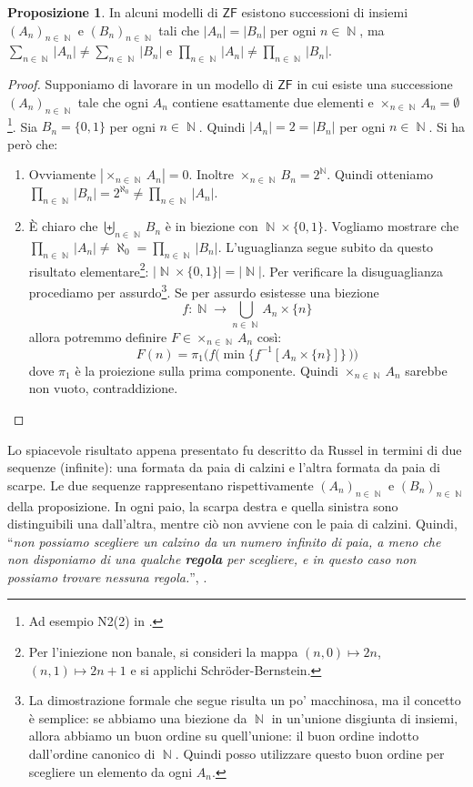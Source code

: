 \documentclass[12pt,a4paper]{report}
\theoremstyle{definition}
\newtheorem{prop}[teo]{Proposizione}  %
\theoremstyle{num.custom-title}
\DeclareMathOperator{\N}{\mathbb{N}}
\newcommand{\ZF}{\ensuremath{\mathsf{ZF}}\xspace}
\begin{document}
\begin{prop}
In alcuni modelli di \ZF esistono successioni di insiemi $(A_n)_{n \in \N}$ e $(B_n)_{n \in \N}$ tali che $|A_n|=|B_n|$ per ogni $n \in \N$, ma $\displaystyle\sum_{n \in \N} |A_n| \neq \displaystyle\sum_{n \in \N} |B_n|$ e $\displaystyle\prod_{n \in \N} |A_n| \neq \displaystyle\prod_{n \in \N} |B_n|$.
\begin{proof}
Supponiamo di lavorare in un modello di \ZF in cui esiste una successione $(A_n)_{n \in \N}$ tale che ogni $A_n$ contiene esattamente due elementi e $\times_{n \in \N} A_n = \emptyset$\footnote{Ad esempio N2(2) in \cite{HoRu98:Herrlich}.}. Sia $B_n=\{0,1\}$ per ogni $n \in \N$. Quindi $|A_n|=2=|B_n|$ per ogni $n \in \N$. Si ha però che:
\begin{enumerate}
\item Ovviamente $|\!\times_{n \in \N} A_n| = 0$. Inoltre $\times_{n \in \N} B_n = 2^{\N}$. Quindi otteniamo\\ $\displaystyle\prod_{n \in \N} |B_n| = 2^{\aleph_0} \neq \displaystyle\prod_{n \in \N} |A_n|$.
\item È chiaro che $\displaystyle\biguplus_{n \in \N} B_n$ è in biezione con $\N \times \{0,1\}$. Vogliamo mostrare che $\displaystyle\prod_{n \in \N} |A_n| \neq \aleph_0 = \displaystyle\prod_{n \in \N} |B_n|$. L'uguaglianza segue subito da questo risultato elementare\footnote{Per l'iniezione non banale, si consideri la mappa $(n,0) \mapsto 2n$, $(n,1) \mapsto 2n+1$ e si applichi Schröder-Bernstein.}: $|\N \times \{0,1\}|=|\N|$. Per verificare la disuguaglianza procediamo per assurdo\footnote{La dimostrazione formale che segue risulta un po' macchinosa, ma il concetto è semplice: se abbiamo una biezione da $\N$ in un'unione disgiunta di insiemi, allora abbiamo un buon ordine su quell'unione: il buon ordine indotto dall'ordine canonico di $\N$. Quindi posso utilizzare questo buon ordine per scegliere un elemento da ogni $A_n$.}. Se per assurdo esistesse una biezione 
\[
f: \N \to \displaystyle\bigcup_{n \in \N} A_n \times \{n\}
\]
allora potremmo definire $F \in \times_{n \in \N} A_n$ così:
\[
F(n)= \pi_1\Big(f\big(\min \big\{f^{-1}[A_n \times \{n\}] \big\} \, \big)\Big)
\]
dove $\pi_1$ è la proiezione sulla prima componente. Quindi $\times_{n \in \N} A_n$ sarebbe non vuoto, contraddizione.
\end{enumerate}
\end{proof}
\end{prop}

Lo spiacevole risultato appena presentato fu descritto da Russel in termini di due sequenze (infinite): una formata da paia di calzini e l'altra formata da paia di scarpe. Le due sequenze rappresentano rispettivamente $(A_n)_{n \in \N}$ e $(B_n)_{n \in \N}$ della proposizione. In ogni paio, la scarpa destra e quella sinistra sono distinguibili una dall'altra, mentre ciò non avviene con le paia di calzini. Quindi, ``\emph{non possiamo scegliere un calzino da un numero infinito di paia, a meno che non disponiamo di una qualche \textbf{regola} per scegliere, e in questo caso non possiamo trovare nessuna regola.}'', \cite{Rus07:Herrlich}.
\end{document}

